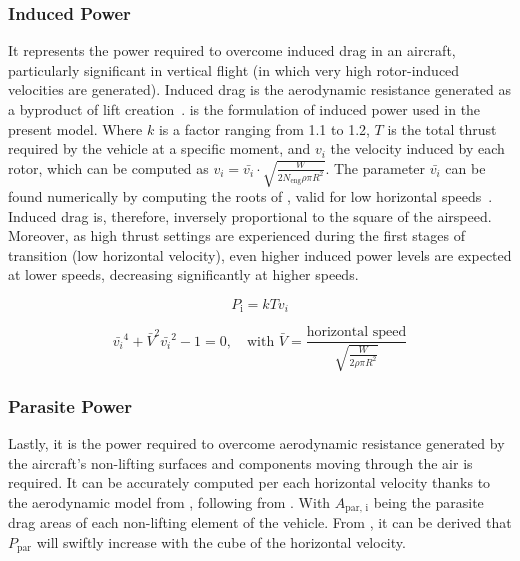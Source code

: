 \subsubsection{Induced Power} 
It represents the power required to overcome induced drag in an aircraft, particularly significant in vertical flight (in which very high rotor-induced velocities are generated).
Induced drag is the aerodynamic resistance generated as a byproduct of lift creation~\cite{helicoptercourseMarilena}.
 is the formulation of induced power used in the present model.
Where $k$ is a factor ranging from 1.1 to 1.2, $T$ is the total thrust required by the vehicle at a specific moment, and $v_i$ the velocity induced by each rotor, which can be computed as $v_i=\bar{v_i}\cdot \sqrt{\frac{W}{2N_{\text{eng}}\rho \pi R^2}}$.
The parameter $\bar{v_i}$ can be found numerically by computing the roots of , valid for low horizontal speeds~\cite{helicoptercourseMarilena}.
Induced drag is, therefore, inversely proportional to the square of the airspeed. Moreover, as high thrust settings are experienced during the first stages of transition (low horizontal velocity), even higher induced power levels are expected at lower speeds, decreasing significantly at higher speeds.

\begin{equation}
\label{eq:inducedPower}
    P_{\text{i}}=kTv_i
\end{equation}

\begin{equation}
\label{eq:vibar}
\bar{v_i}^4+\bar{V}^2\bar{v_i}^2-1=0,\quad\text{with }\bar{V}=\frac{\text{horizontal speed}}{\sqrt{\frac{W}{2\rho \pi R^2}}}
\end{equation}

\subsubsection{Parasite Power}
Lastly, it is the power required to overcome aerodynamic resistance generated by the aircraft’s non-lifting surfaces and components moving through the air is required.
It can be accurately computed per each horizontal velocity thanks to the aerodynamic model from , following from .
With $A_{\text{par, i}}$ being the parasite drag areas of each non-lifting element of the vehicle.
From , it can be derived that $P_{\text{par}}$ will swiftly increase with the cube of the horizontal velocity.

